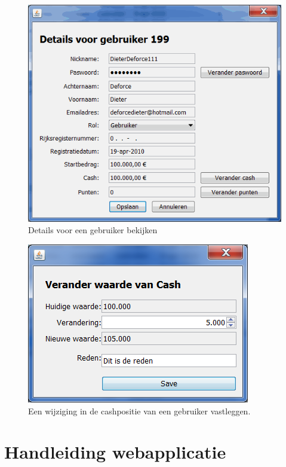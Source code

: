 \begin{figure}[h!]
	\centering
		\includegraphics[width=\textwidth]{images/handleiding/handleiding3.png}
	\caption{Details voor een gebruiker bekijken}
\end{figure}

\begin{figure}[h!]
	\centering
		\includegraphics[width=\textwidth]{images/handleiding/handleiding2.png}
	\caption{Een wijziging in de cashpositie van een gebruiker vastleggen.}
\end{figure}

\chapter{Handleiding webapplicatie}

